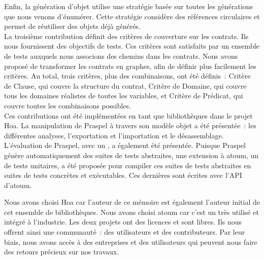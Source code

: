 Enfin, la génération d'objet utilise une stratégie basée sur toutes les
générations que nous venons d'énumérer. Cette stratégie considère des références
circulaires et permet de réutiliser des objets déjà générés. \\

La troisième contribution définit des critères de couverture sur les contrats.
Ils nous fournissent des objectifs de tests. Ces critères sont satisfaits par un
ensemble de tests auxquels nous associons des chemins dans les contrats. Nous
avons proposé de transformer les contrats en graphes, afin de définir plus
facilement les critères. Au total, trois critères, plus des combinaisons, ont
été définis~: Critère de Clause, qui couvre la structure du contrat, Critère de
Domaine, qui couvre tous les domaines réalistes de toutes les variables, et
Critère de Prédicat, qui couvre toutes les combinaisons possibles. \\

Ces contributions ont été implémentées en tant que bibliothèques dans le projet
Hoa. La manipulation de Praspel à travers son modèle objet a été présentée~: les
différentes analyses, l'exportation et l'importation et le désassemblage.
L'évaluation de Praspel, avec un , a
également été présentée. Puisque Praspel génère automatiquement des suites de
tests abstraites, une extension à atoum, un  de tests
unitaires, a été proposée pour compiler ces suites de tests abstraites en suites
de tests concrètes et exécutables. Ces dernières sont écrites avec l'API
d'atoum.

Nous avons choisi Hoa car l'auteur de ce mémoire est également l'auteur initial
de cet ensemble de bibliothèques. Nous avons choisi atoum car c'est un
 très utilisé et intégré à l'industrie. Les deux projets
ont des licences  et sont libres. Ils nous offrent ainsi
une communauté~: des utilisateurs et des contributeurs. Par leur biais, nous
avons accès à des entreprises et des utilisateurs qui peuvent nous faire des
retours précieux sur nos travaux. \\

